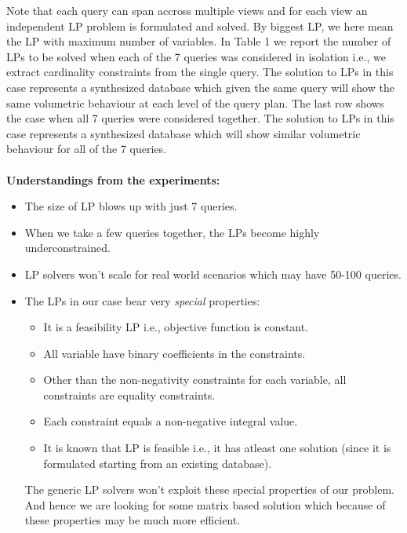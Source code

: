 \documentclass[]{article}
\begin{document}
\begin{multicols}{2}
	 	Note that each query can span accross multiple views and for each view an independent LP problem is formulated and solved.
	 	By biggest LP, we here mean the LP with maximum number of variables. 
		In Table 1 we report the number of LPs to be solved when each of the 7 queries was considered in isolation i.e., we extract cardinality constraints from the single query. 
		The solution to LPs in this case represents a synthesized database which given the same query will show the same volumetric behaviour at each level of the query plan. 
		The last row shows the case when all 7 queries were considered together. 
		The solution to LPs in this case represents a synthesized database which will show similar volumetric behaviour for all of the 7 queries. 
		\\ \\
		\textbf{Understandings from the experiments: }
			\begin{itemize}
                    		\item The size of LP blows up with just 7 queries. 
                    		\item When we take a few queries together, the LPs become highly underconstrained.
                    		\item LP solvers won't scale for real world scenarios which may have 50-100 queries. 
				\item The LPs in our case bear very \textit{special} properties:
			\begin{itemize}
                	\item It is a feasibility LP i.e., objective function is constant.
                	\item All variable have binary coefficients in the constraints. 
                	\item Other than the non-negativity constraints for each variable, all constraints are equality constraints. 
                	\item Each constraint equals a non-negative integral value. 
			\item It is known that LP is feasible i.e., it has atleast one solution (since it is formulated starting from an existing database). 
        	\end{itemize}
			The generic LP solvers won't exploit these special properties of our problem. 
			And hence we are looking for some matrix based solution which because of these properties may be much more efficient. 
		\end{itemize}



\end{multicols}
\end{document}
